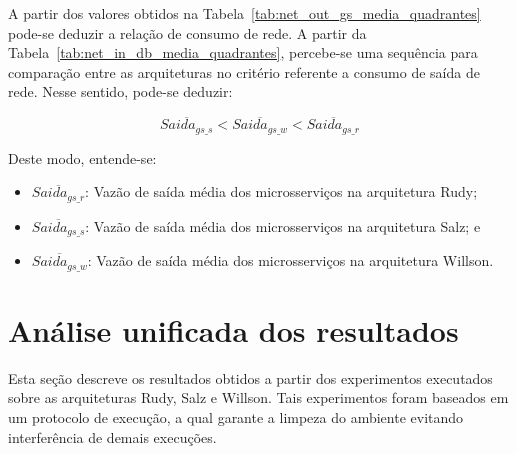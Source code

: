 A partir dos valores obtidos na Tabela~\ref{tab:net_out_gs_media_quadrantes} pode-se deduzir a relação de consumo de rede.
%
A partir da Tabela~\ref{tab:net_in_db_media_quadrantes}, percebe-se uma sequência para comparação entre as arquiteturas no critério referente a consumo de saída de rede.
%
Nesse sentido, pode-se deduzir:

$$
    \overline{Saida_{gs\_s}} < \overline{Saida_{gs\_w}} < \overline{Saida_{gs\_r}}
$$

Deste modo, entende-se:

\begin{itemize}
 \item $\overline{Saida_{gs\_r}}$: Vazão de saída média dos microsserviços na arquitetura Rudy;
 \item $\overline{Saida_{gs\_s}}$: Vazão de saída média dos microsserviços na arquitetura Salz; e
 \item $\overline{Saida_{gs\_w}}$: Vazão de saída média dos microsserviços na arquitetura Willson.
\end{itemize}

\section{Análise unificada dos resultados}
\label{sec:experimentos_conc}

Esta seção descreve os resultados obtidos a partir dos experimentos executados sobre as arquiteturas Rudy, Salz e Willson.
%
Tais experimentos foram baseados em um protocolo de execução, a qual garante a limpeza do ambiente evitando interferência de demais execuções.

